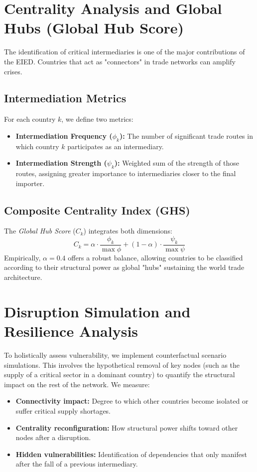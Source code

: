 \documentclass[final,1p,times,authoryear]{elsarticle}
\begin{document}
\section{Centrality Analysis and Global Hubs (Global Hub Score)}

The identification of critical intermediaries is one of the major contributions of the EIED. Countries that act as "connectors" in trade networks can amplify crises.

\subsection{Intermediation Metrics}
For each country $k$, we define two metrics:
\begin{itemize}
    \item \textbf{Intermediation Frequency ($\phi_k$):} The number of significant trade routes in which country $k$ participates as an intermediary.
    \item \textbf{Intermediation Strength ($\psi_k$):} Weighted sum of the strength of those routes, assigning greater importance to intermediaries closer to the final importer.
\end{itemize}

\subsection{Composite Centrality Index (GHS)}
The \textit{Global Hub Score} ($C_k$) integrates both dimensions:
\begin{equation}
C_k = \alpha \cdot \frac{\phi_k}{\max \phi} + (1-\alpha) \cdot \frac{\psi_k}{\max \psi}
\end{equation}
Empirically, $\alpha = 0.4$ offers a robust balance, allowing countries to be classified according to their structural power as global "hubs" sustaining the world trade architecture.

\section{Disruption Simulation and Resilience Analysis}

To holistically assess vulnerability, we implement counterfactual scenario simulations. This involves the hypothetical removal of key nodes (such as the supply of a critical sector in a dominant country) to quantify the structural impact on the rest of the network. We measure:
\begin{itemize}
    \item \textbf{Connectivity impact:} Degree to which other countries become isolated or suffer critical supply shortages.
    \item \textbf{Centrality reconfiguration:} How structural power shifts toward other nodes after a disruption.
    \item \textbf{Hidden vulnerabilities:} Identification of dependencies that only manifest after the fall of a previous intermediary.
\end{itemize}
\end{document}
